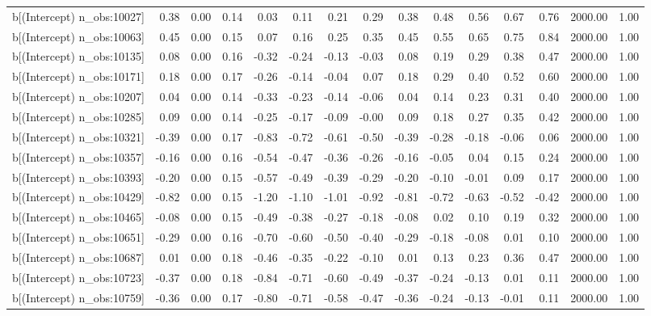 \begin{table}[ht]
\begin{tabular}{rrrrrrrrrrrrrrr}
  b[(Intercept) n\_obs:10027] & 0.38 & 0.00 & 0.14 & 0.03 & 0.11 & 0.21 & 0.29 & 0.38 & 0.48 & 0.56 & 0.67 & 0.76 & 2000.00 & 1.00 \\ 
  b[(Intercept) n\_obs:10063] & 0.45 & 0.00 & 0.15 & 0.07 & 0.16 & 0.25 & 0.35 & 0.45 & 0.55 & 0.65 & 0.75 & 0.84 & 2000.00 & 1.00 \\ 
  b[(Intercept) n\_obs:10135] & 0.08 & 0.00 & 0.16 & -0.32 & -0.24 & -0.13 & -0.03 & 0.08 & 0.19 & 0.29 & 0.38 & 0.47 & 2000.00 & 1.00 \\ 
  b[(Intercept) n\_obs:10171] & 0.18 & 0.00 & 0.17 & -0.26 & -0.14 & -0.04 & 0.07 & 0.18 & 0.29 & 0.40 & 0.52 & 0.60 & 2000.00 & 1.00 \\ 
  b[(Intercept) n\_obs:10207] & 0.04 & 0.00 & 0.14 & -0.33 & -0.23 & -0.14 & -0.06 & 0.04 & 0.14 & 0.23 & 0.31 & 0.40 & 2000.00 & 1.00 \\ 
  b[(Intercept) n\_obs:10285] & 0.09 & 0.00 & 0.14 & -0.25 & -0.17 & -0.09 & -0.00 & 0.09 & 0.18 & 0.27 & 0.35 & 0.42 & 2000.00 & 1.00 \\ 
  b[(Intercept) n\_obs:10321] & -0.39 & 0.00 & 0.17 & -0.83 & -0.72 & -0.61 & -0.50 & -0.39 & -0.28 & -0.18 & -0.06 & 0.06 & 2000.00 & 1.00 \\ 
  b[(Intercept) n\_obs:10357] & -0.16 & 0.00 & 0.16 & -0.54 & -0.47 & -0.36 & -0.26 & -0.16 & -0.05 & 0.04 & 0.15 & 0.24 & 2000.00 & 1.00 \\ 
  b[(Intercept) n\_obs:10393] & -0.20 & 0.00 & 0.15 & -0.57 & -0.49 & -0.39 & -0.29 & -0.20 & -0.10 & -0.01 & 0.09 & 0.17 & 2000.00 & 1.00 \\ 
  b[(Intercept) n\_obs:10429] & -0.82 & 0.00 & 0.15 & -1.20 & -1.10 & -1.01 & -0.92 & -0.81 & -0.72 & -0.63 & -0.52 & -0.42 & 2000.00 & 1.00 \\ 
  b[(Intercept) n\_obs:10465] & -0.08 & 0.00 & 0.15 & -0.49 & -0.38 & -0.27 & -0.18 & -0.08 & 0.02 & 0.10 & 0.19 & 0.32 & 2000.00 & 1.00 \\ 
  b[(Intercept) n\_obs:10651] & -0.29 & 0.00 & 0.16 & -0.70 & -0.60 & -0.50 & -0.40 & -0.29 & -0.18 & -0.08 & 0.01 & 0.10 & 2000.00 & 1.00 \\ 
  b[(Intercept) n\_obs:10687] & 0.01 & 0.00 & 0.18 & -0.46 & -0.35 & -0.22 & -0.10 & 0.01 & 0.13 & 0.23 & 0.36 & 0.47 & 2000.00 & 1.00 \\ 
  b[(Intercept) n\_obs:10723] & -0.37 & 0.00 & 0.18 & -0.84 & -0.71 & -0.60 & -0.49 & -0.37 & -0.24 & -0.13 & 0.01 & 0.11 & 2000.00 & 1.00 \\ 
  b[(Intercept) n\_obs:10759] & -0.36 & 0.00 & 0.17 & -0.80 & -0.71 & -0.58 & -0.47 & -0.36 & -0.24 & -0.13 & -0.01 & 0.11 & 2000.00 & 1.00 \\ 

\end{tabular}
\end{table}
